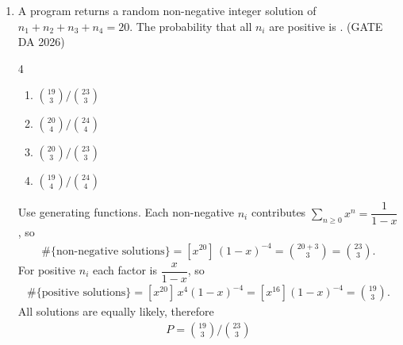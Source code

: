 \begin{enumerate}[label=\textbf{Q.\arabic*},leftmargin=*,start=1]
\item[\textbf{Q.20}] A program returns a random non-negative integer solution of
$n_1+n_2+n_3+n_4=20$. The probability that all $n_i$ are positive is
\underline{\hspace{1.5cm}}.
\hfill (GATE DA 2026)
\begin{multicols}{4}
\begin{enumerate}[label=(\alph*),itemsep=0pt]
 \item $\binom{19}{3}/\binom{23}{3}$
 \item $\binom{20}{4}/\binom{24}{4}$
 \item $\binom{20}{3}/\binom{23}{3}$
 \item $\binom{19}{4}/\binom{24}{4}$
\end{enumerate}
\end{multicols}
\solution
Use generating functions. Each non-negative $n_i$ contributes
$\sum_{n\ge0}x^n=\dfrac1{1-x}$, so
\begin{align}
\#\{\text{non-negative solutions}\}=[x^{20}]\,(1-x)^{-4}=\binom{20+3}{3}=\binom{23}{3}.
\end{align}
For positive $n_i$ each factor is $\dfrac{x}{1-x}$, so
\begin{align}
\#\{\text{positive solutions}\}=[x^{20}]\,x^4(1-x)^{-4}=[x^{16}](1-x)^{-4}=\binom{19}{3}.
\end{align}
All solutions are equally likely, therefore
\begin{align}
P=\boxed{\binom{19}{3}\Big/\binom{23}{3}}
\end{align}


\end{enumerate}
